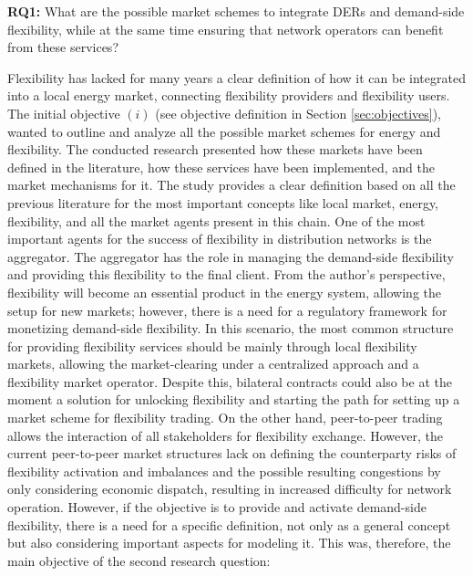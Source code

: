 \begin{tcolorbox}
\textbf{RQ1:} What are the possible market schemes to integrate DERs and demand-side flexibility, while at the same time ensuring that network operators can benefit from these services?  
\end{tcolorbox}

Flexibility has lacked for many years a clear definition of how it can be integrated into a local energy market, connecting flexibility providers and flexibility users. The initial objective $(i)$ (see objective definition in Section \ref{sec:objectives}), wanted to outline and analyze all the possible market schemes for energy and flexibility. The conducted research presented how these markets have been defined in the literature, how these services have been implemented, and the market mechanisms for it. The study provides a clear definition based on all the previous literature for the most important concepts like local market, energy, flexibility, and all the market agents present in this chain. One of the most important agents for the success of flexibility in distribution networks is the aggregator. The aggregator has the role in managing the demand-side flexibility and providing this flexibility to the final client. From the author's perspective, flexibility will become an essential product in the energy system, allowing the setup for new markets; however, there is a need for a regulatory framework for monetizing demand-side flexibility. In this scenario, the most common structure for providing flexibility services should be mainly through local flexibility markets, allowing the market-clearing under a centralized approach and a flexibility market operator. Despite this, bilateral contracts could also be at the moment a solution for unlocking flexibility and starting the path for setting up a market scheme for flexibility trading. On the other hand, peer-to-peer trading allows the interaction of all stakeholders for flexibility exchange. However, the current peer-to-peer market structures lack on defining the counterparty risks of flexibility activation and imbalances and the possible resulting congestions by only considering economic dispatch, resulting in increased difficulty for network operation.
However, if the objective is to provide and activate demand-side flexibility, there is a need for a specific definition, not only as a general concept but also considering important aspects for modeling it. This was, therefore, the main objective of the second research question: 

